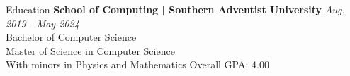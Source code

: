 \begin{rSection}{Education}
	{\bf School of Computing | Southern Adventist University} \hfill {\em Aug. 2019 - May 2024}\\
	Bachelor of Computer Science\\
	Master of Science in Computer Science\\
	With minors in Physics and Mathematics
	\hfill {Overall GPA: 4.00}
\end{rSection}